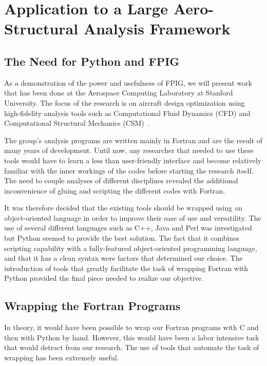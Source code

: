 \documentclass[twocolumn]{article}
\begin{document}
\section{Application to a Large Aero-Structural Analysis Framework}
\label{sec:app}


\subsection{The Need for Python and FPIG}
\label{sec:appsub1}

As a demonstration of the power and usefulness of FPIG, we will
present work that has been done at the Aerospace Computing Laboratory
at Stanford University. The focus of the research is on aircraft
design optimization using high-fidelity analysis tools such as
Computational Fluid Dynamics (CFD) and Computational Structural
Mechanics (CSM)~\cite{reno99}.

The group's analysis programs are written mainly in Fortran and are the result
of many years of development.  Until now, any researcher that needed
to use these tools would have to learn a less than user-friendly
interface and become relatively familiar with the inner workings of
the codes before starting the research itself.  The need to
couple analyses of different disciplines revealed the additional
inconvenience of gluing and scripting the different codes with
Fortran.

It was therefore decided that the existing tools should be wrapped
using an object-oriented language in order to improve their ease of
use and versatility.  The use of several different languages such as
C++, Java and Perl was investigated but Python seemed to provide the
best solution. The fact that it combines scripting capability
with a fully-featured object-oriented programming language, and that
it has a clean syntax were factors that determined our choice. The
introduction of tools that greatly facilitate the task of wrapping
Fortran with Python provided the final piece needed to realize our
objective.

\subsection{Wrapping the Fortran Programs}

In theory, it would have been possible to wrap our Fortran programs
with C and then with Python by hand.  However, this would have been a
labor intensive task that would detract from our research.  The use of
tools that automate the task of wrapping has been extremely useful.
\end{document}

